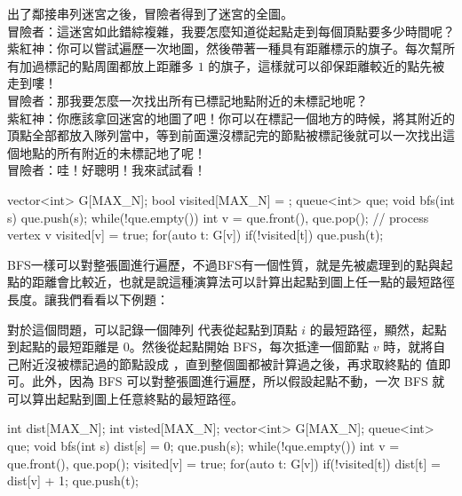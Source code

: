 出了鄰接串列迷宮之後，冒險者得到了迷宮的全圖。\\

冒險者：這迷宮如此錯綜複雜，我要怎麼知道從起點走到每個頂點要多少時間呢？\\

紫紅神：你可以嘗試遍歷一次地圖，然後帶著一種具有距離標示的旗子。每次幫所有加過標記的點周圍都放上距離多 $1$ 的旗子，這樣就可以卻保距離較近的點先被走到嘍！\\

冒險者：那我要怎麼一次找出所有已標記地點附近的未標記地呢？\\

紫紅神：你應該拿回迷宮的地圖了吧！你可以在標記一個地方的時候，將其附近的頂點全部都放入隊列當中，等到前面還沒標記完的節點被標記後就可以一次找出這個地點的所有附近的未標記地了呢！\\

冒險者：哇！好聰明！我來試試看！\\

\begin{C++}
vector<int> G[MAX_N];
bool visited[MAX_N] = {};
queue<int> que;
void bfs(int s){
    que.push(s);
    while(!que.empty()){
        int v = que.front(), que.pop();
        // process vertex v
        visited[v] = true;
        for(auto t: G[v]){
            if(!visited[t]) que.push(t);
        }
    }
}
\end{C++}

BFS一樣可以對整張圖進行遍歷，不過BFS有一個性質，就是先被處理到的點與起點的距離會比較近，也就是說這種演算法可以計算出起點到圖上任一點的最短路徑長度。讓我們看看以下例題：


對於這個問題，可以記錄一個陣列  代表從起點到頂點 $i$ 的最短路徑，顯然，起點到起點的最短距離是 $0$。然後從起點開始 BFS，每次抵達一個節點 $v$ 時，就將自己附近沒被標記過的節點設成 ，直到整個圖都被計算過之後，再求取終點的  值即可。此外，因為 BFS 可以對整張圖進行遍歷，所以假設起點不動，一次 BFS 就可以算出起點到圖上任意終點的最短路徑。

\begin{C++}
int dist[MAX_N];
int visted[MAX_N];
vector<int> G[MAX_N];
queue<int> que;
void bfs(int s){
    dist[s] = 0;
    que.push(s);
    while(!que.empty()){
        int v = que.front(), que.pop();
        visited[v] = true;
        for(auto t: G[v]){
            if(!visited[t]){
                dist[t] = dist[v] + 1;
                que.push(t);
            }
        }
    }
}
\end{C++}

